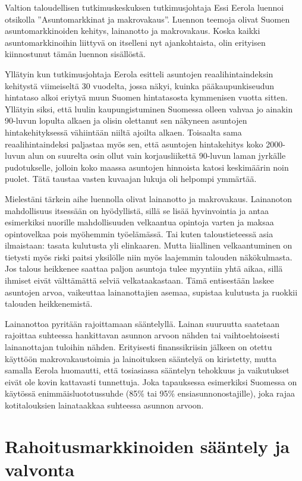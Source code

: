 \documentclass[12pt]{article}
\begin{document}
Valtion taloudellisen tutkimuskeskuksen tutkimusjohtaja Essi Eerola luennoi otsikolla ''Asuntomarkkinat ja makrovakaus''. Luennon teemoja olivat Suomen asuntomarkkinoiden kehitys, lainanotto ja makrovakaus. Koska kaikki asuntomarkkinoihin liittyvä on itselleni nyt ajankohtaista, olin erityisen kiinnostunut tämän luennon sisällöstä.

Yllätyin kun tutkimusjohtaja Eerola esitteli asuntojen reaalihintaindeksin kehitystä viimeiseltä 30 vuodelta, jossa näkyi, kuinka pääkaupunkiseudun hintataso alkoi eriytyä muun Suomen hintatasosta kymmenisen vuotta sitten. Yllätyin siksi, että luulin kaupungistuminen Suomessa olleen vahvaa jo ainakin 90-luvun lopulta alkaen ja olisin olettanut sen näkyneen asuntojen hintakehityksessä vähiintään niiltä ajoilta alkaen. Toisaalta sama reaalihintaindeksi paljastaa myös sen, että asuntojen hintakehitys koko 2000-luvun alun on suurelta osin ollut vain korjausliikettä 90-luvun laman jyrkälle pudotukselle, jolloin koko maassa asuntojen hinnoista katosi keskimäärin noin puolet. Tätä taustaa vasten kuvaajan lukuja oli helpompi ymmärtää.

Mielestäni tärkein aihe luennolla olivat lainanotto ja makrovakaus. Lainanoton mahdollisuus itsessään on hyödyllistä, sillä se lisää hyvinvointia ja antaa esimerkiksi nuorille mahdollisuuden velkaantua opintoja varten ja maksaa opintovelkaa pois myöhemmin työelämässä. Tai kuten taloustieteessä asia ilmaistaan: tasata kulutusta yli elinkaaren. Mutta liiallinen velkaantuminen on tietysti myös riski paitsi yksilölle niin myös laajemmin talouden näkökulmasta. Jos talous heikkenee saattaa paljon asuntoja tulee myyntiin yhtä aikaa, sillä ihmiset eivät välttämättä selviä velkataakastaan. Tämä entisestään laskee asuntojen arvoa, vaikeuttaa lainanottajien asemaa, supistaa kulutusta ja ruokkii talouden heikkenemistä.

Lainanottoa pyritään rajoittamaan sääntelyllä. Lainan suuruutta saatetaan rajoittaa suhteessa hankittavan asunnon arvoon nähden tai vaihtoehtoisesti lainanottajan tuloihin nähden. Erityisesti finanssikriisin jälkeen on otettu käyttöön makrovakaustoimia ja lainoituksen sääntelyä on kiristetty, mutta samalla Eerola huomautti, että tosiasiassa sääntelyn tehokkuus ja vaikutukset eivät ole kovin kattavasti tunnettuja. Joka tapauksessa esimerkiksi Suomessa on käytössä enimmäisluototussuhde (85\% tai 95\% ensiasunnonostajille), joka rajaa kotitalouksien lainataakkaa suhteessa asunnon arvoon.


\newpage
\section{Rahoitusmarkkinoiden sääntely ja valvonta}
\end{document}
